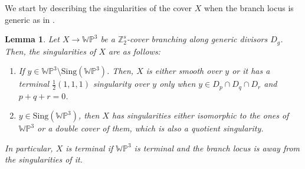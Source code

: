 \documentclass[12pt,twoside,]{amsart}
\theoremstyle{plain}
\newtheorem{lemma}[theorem]{Lemma}
\theoremstyle{definition}
\begin{document}
We start by describing the singularities of the cover $X$ when the branch locus is generic as in .

\begin{lemma}\label{lemma:singDpqr}\label{singularities of the cover}
 Let $X \rightarrow \mathbb{WP}^3$ be a  $\mathbb{Z}_2^s$-cover branching along 
generic divisors $D_g$. Then, the singularities of $X$ are as follows:
\begin{enumerate}
    \item If 
    $y \in \mathbb{WP}^3 \setminus 
    \text{Sing}(\mathbb{WP}^3)$. Then, $X$ is either smooth over $y$ or it has a terminal $\frac{1}{2}(1,1,1)$ singularity over $y$ only when  $y \in D_p \cap D_q \cap D_r$ and $p+q+r=0$.
    \item $y \in \text{Sing}(\mathbb{WP}^3)$, then $X$ has singularities either isomorphic to the ones of $\mathbb{WP}^3$ or a double cover of them, which is also a quotient singularity.
\end{enumerate}
In particular, $X$ is terminal if $\mathbb{WP}^3$ is terminal and the branch locus is away from the singularities of it.
\end{lemma}
\end{document}
